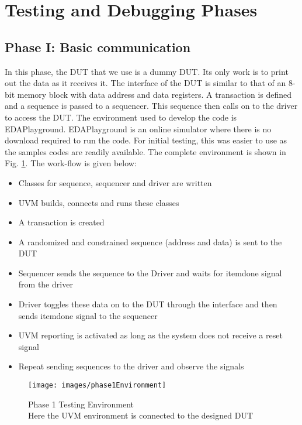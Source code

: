 \documentclass[a4paper,11pt]{article}
\begin{document}
\FloatBarrier
\newpage
\pagebreak

\section{Testing and Debugging Phases}
\subsection{Phase I: Basic communication}
In this phase, the DUT that we use is a dummy DUT. Its only work is to print out the data as it receives it. The interface of the DUT is similar to that of an 8-bit memory block with data address and data registers. A transaction is defined and a sequence is passed to a sequencer. This sequence then calls on to the driver to access the DUT. The environment used to develop the code is EDAPlayground. EDAPlayground is an online simulator where there is no download required to run the code. For initial testing, this was easier to use as the samples codes are readily available. The complete environment is shown in Fig. \ref{fig: Phase I testing enviroment}.
The work-flow is given below:

\begin{itemize}[noitemsep]
\item Classes for sequence, sequencer and driver are written
\item UVM builds, connects and runs these classes
\item A transaction is created
\item A randomized and constrained sequence (address and data) is sent to the DUT
\item Sequencer sends the sequence to the Driver and waits for item\textunderscore done signal from the driver
\item Driver toggles these data on to the DUT through the interface and then sends item\textunderscore done signal to the sequencer
\item UVM reporting is activated as long as the system does not receive a reset signal
\item Repeat sending sequences to the driver and observe the signals
\end{itemize}

\begin{figure}[ht]
\centering
\texttt{[image: images/phase1Environment]}
\caption{Phase 1 Testing Environment\\Here the UVM environment is connected to the designed DUT}
\label{fig: Phase I testing enviroment}
\end{figure}
\end{document}
